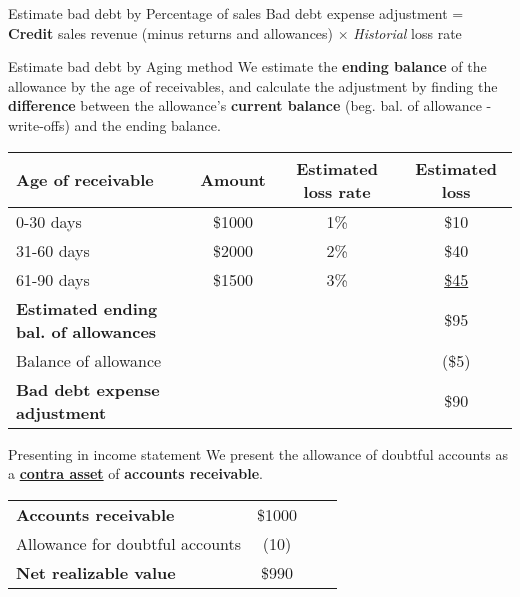 \begin{theorem}
    {Estimate bad debt by Percentage of sales}
    Bad debt expense adjustment = \textbf{Credit} sales revenue (minus returns and allowances) $\times$ \textit{Historial} loss rate
\end{theorem}

\begin{theorem}
    {Estimate bad debt by Aging method}
    We estimate the \textbf{ending balance} of the allowance by the age of receivables, and calculate the adjustment by finding the \textbf{difference} between the allowance's \textbf{current balance} (beg. bal. of allowance - write-offs) and the ending balance.

    \begin{tabular}{lccc}
        \textbf{Age of receivable}                   & \textbf{Amount} & \textbf{Estimated loss rate} & \textbf{Estimated loss} \\
        \hline
        0-30 days                                    & \$1000          & 1\%                          & \$10                    \\
        31-60 days                                   & \$2000          & 2\%                          & \$40                    \\
        61-90 days                                   & \$1500          & 3\%                          & \underline{\$45}        \\
        \textbf{Estimated ending bal. of allowances} &                 &                              & \$95                    \\
        Balance of allowance                         &                 &                              & (\$5)                   \\
        \textbf{Bad debt expense adjustment}         &                 &                              & \$90                    \\
    \end{tabular}
\end{theorem}

\begin{knBox}
    {Presenting in income statement}
    We present the allowance of doubtful accounts as a \hyperref[def:contra]{\textbf{contra asset}} of \textbf{accounts receivable}.

    \begin{tabular}{lccc}
        \textbf{Accounts receivable}          & \$1000 \\
        \quad Allowance for doubtful accounts & (10)   \\
        \textbf{Net realizable value}         & \$990  \\
    \end{tabular}
\end{knBox}

